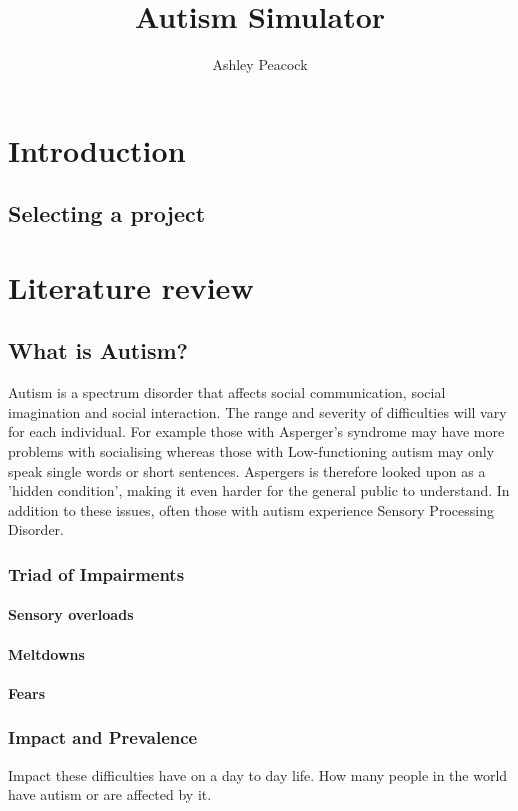 \documentclass[11pt]{report}
\begin{document}
\title{Autism Simulator}
\author{Ashley Peacock}
\maketitle
\tableofcontents
\chapter{Introduction}

\section{Selecting a project}


\chapter{Literature review}
\section{What is Autism?}
Autism is a spectrum disorder that affects social communication, social imagination and social interaction. The range and severity of difficulties will vary for each individual. For example those with Asperger's syndrome may have more problems with socialising whereas those with Low-functioning autism may only speak single words or short sentences. Aspergers is therefore looked upon as a 'hidden condition', making it even harder for the general public to understand. 
In addition to these issues, often those with autism experience Sensory Processing Disorder. 
\subsection{Triad of Impairments}
\subsubsection{Sensory overloads}
\subsubsection{Meltdowns}
\subsubsection{Fears}
\subsection{Impact and Prevalence}
Impact these difficulties have on a day to day life.
How many people in the world have autism or are affected by it.
\end{document}
